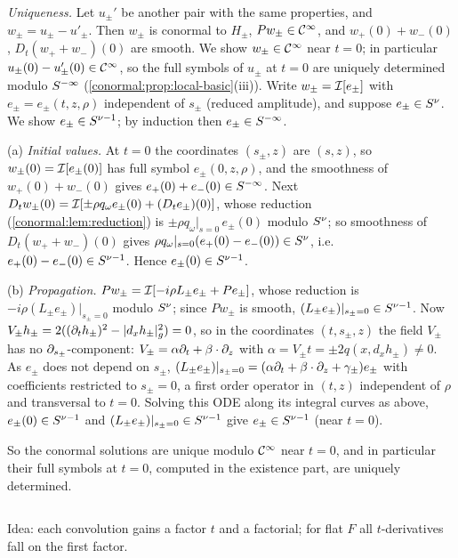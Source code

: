 \emph{Uniqueness.} Let $u_\pm'$ be another pair with the same properties, and $w_\pm=u_\pm-u'_\pm$.
Then $w_\pm$ is conormal to $H_\pm$, $Pw_\pm\in\mathcal{C}^\infty$, and $w_+(0)+w_-(0)$, $D_t(w_++w_-)(0)$ are smooth.
We show $w_\pm\in\mathcal{C}^\infty$ near $t=0$; in particular $u_\pm(0)-u'_\pm(0)\in\mathcal{C}^\infty$, so the full symbols of
$u_\pm$ at $t=0$ are uniquely determined modulo $S^{-\infty}$ (\cref{conormal:prop:local-basic}(iii)).
Write $w_\pm=\mathcal{I}[e_\pm]$ with $e_\pm=e_\pm(t,z,\rho)$ independent of $s_\pm$ (reduced amplitude), and
suppose $e_\pm\in S^{\nu}$. We show $e_\pm\in S^{\nu-1}$; by induction then $e_\pm\in S^{-\infty}$.

(a) \emph{Initial values.} At $t=0$ the coordinates $(s_\pm,z)$ are $(s,z)$, so $w_\pm(0)=\mathcal{I}[e_\pm(0)]$
has full symbol $e_\pm(0,z,\rho)$, and the smoothness of $w_+(0)+w_-(0)$ gives
$e_+(0)+e_-(0)\in S^{-\infty}$. Next $D_tw_\pm(0)=\mathcal{I}[\pm\rho q_\omega e_\pm(0)+(D_te_\pm)(0)]$, whose
reduction (\cref{conormal:lem:reduction}) is $\pm\rho q_\omega|_{s=0}\,e_\pm(0)$ modulo $S^{\nu}$; so
smoothness of $D_t(w_++w_-)(0)$ gives $\rho q_\omega|_{s=0}(e_+(0)-e_-(0))\in S^{\nu}$, i.e.\
$e_+(0)-e_-(0)\in S^{\nu-1}$. Hence $e_\pm(0)\in S^{\nu-1}$.

(b) \emph{Propagation.} $Pw_\pm=\mathcal{I}[-i\rho L_\pm e_\pm+Pe_\pm]$, whose reduction is $-i\rho(L_\pm e_\pm)|_{s_\pm=0}$
modulo $S^{\nu}$; since $Pw_\pm$ is smooth, $(L_\pm e_\pm)|_{s_\pm=0}\in S^{\nu-1}$. Now
$V_\pm h_\pm=2((\partial_th_\pm)^2-|d_xh_\pm|_g^2)=0$, so in the coordinates $(t,s_\pm,z)$ the field $V_\pm$ has
no $\partial_{s_\pm}$-component: $V_\pm=\alpha\partial_t+\beta\cdot\partial_z$ with $\alpha=V_\pm t=\pm2q(x,d_xh_\pm)\ne0$.
As $e_\pm$ does not depend on $s_\pm$, $(L_\pm e_\pm)|_{s_\pm=0}=(\alpha\partial_t+\beta\cdot\partial_z+\gamma_\pm)e_\pm$
with coefficients restricted to $s_\pm=0$, a first order operator in $(t,z)$ independent of $\rho$ and
transversal to $t=0$. Solving this ODE along its integral curves as above, $e_\pm(0)\in S^{\nu-1}$ and
$(L_\pm e_\pm)|_{s_\pm=0}\in S^{\nu-1}$ give $e_\pm\in S^{\nu-1}$ (near $t=0$).

So the conormal solutions are unique modulo $\mathcal{C}^\infty$ near $t=0$, and in particular their full symbols at
$t=0$, computed in the existence part, are uniquely determined.

\subsection*{\Cref{wave:ex:volterra}}
Idea: each convolution gains a factor $t$ and a factorial; for flat $F$ all $t$-derivatives
fall on the first factor.

